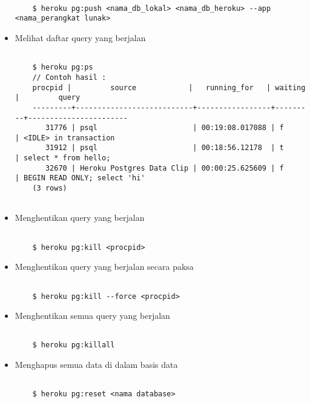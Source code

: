 \begin{itemize}
\begin{lstlisting}

	$ heroku pg:push <nama_db_lokal> <nama_db_heroku> --app <nama_perangkat lunak>

\end{lstlisting}

\item Melihat daftar query yang berjalan

\begin{lstlisting}

	$ heroku pg:ps
	// Contoh hasil :
	procpid |         source            |   running_for   | waiting |         query
	---------+---------------------------+-----------------+---------+-----------------------
	   31776 | psql                      | 00:19:08.017088 | f       | <IDLE> in transaction
	   31912 | psql                      | 00:18:56.12178  | t       | select * from hello;
	   32670 | Heroku Postgres Data Clip | 00:00:25.625609 | f       | BEGIN READ ONLY; select 'hi'
	(3 rows)
	
\end{lstlisting}

\item Menghentikan query yang berjalan

\begin{lstlisting}

	$ heroku pg:kill <procpid>

\end{lstlisting}

\item Menghentikan query yang berjalan secara paksa

\begin{lstlisting}

	$ heroku pg:kill --force <procpid>

\end{lstlisting}

\item Menghentikan semua query yang berjalan

\begin{lstlisting}

	$ heroku pg:killall

\end{lstlisting}

\item Menghapus semua data di dalam basis data

\begin{lstlisting}

	$ heroku pg:reset <nama database>

\end{lstlisting}
\end{itemize}

